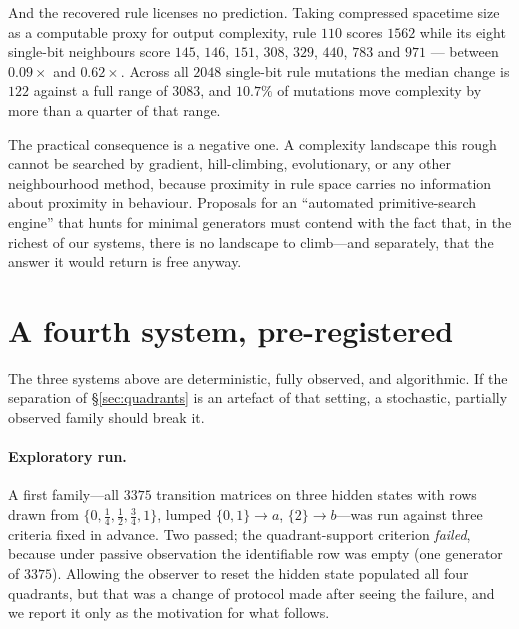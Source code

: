\documentclass[11pt]{article}
\begin{document}
And the recovered rule licenses no prediction. Taking compressed spacetime size as a
computable proxy for output complexity, rule $110$ scores $1562$ while its eight
single-bit neighbours score $145$, $146$, $151$, $308$, $329$, $440$, $783$ and $971$
--- between $0.09\times$ and $0.62\times$. Across all $2048$ single-bit rule mutations
the median change is $122$ against a full range of $3083$, and $10.7\%$ of mutations
move complexity by more than a quarter of that range.

The practical consequence is a negative one. A complexity landscape this rough cannot
be searched by gradient, hill-climbing, evolutionary, or any other neighbourhood
method, because proximity in rule space carries no information about proximity in
behaviour. Proposals for an ``automated primitive-search engine'' that hunts for
minimal generators must contend with the fact that, in the richest of our systems,
there is no landscape to climb---and separately, that the answer it would return is
free anyway.

\section{A fourth system, pre-registered}\label{sec:stochastic}

The three systems above are deterministic, fully observed, and algorithmic. If the
separation of \S\ref{sec:quadrants} is an artefact of that setting, a stochastic,
partially observed family should break it.

\paragraph{Exploratory run.}
A first family---all $3375$ transition matrices on three hidden states with rows drawn
from $\{0,\frac14,\frac12,\frac34,1\}$, lumped $\{0,1\}\!\to\!a$, $\{2\}\!\to\!b$---was
run against three criteria fixed in advance. Two passed; the quadrant-support criterion
\emph{failed}, because under passive observation the identifiable row was empty (one
generator of $3375$). Allowing the observer to reset the hidden state populated all four
quadrants, but that was a change of protocol made after seeing the failure, and we report
it only as the motivation for what follows.
\end{document}
